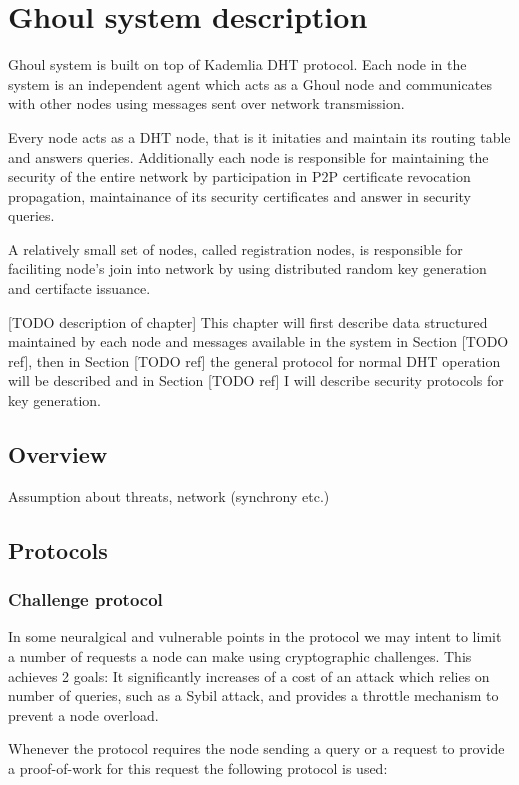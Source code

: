 \chapter{Ghoul system description}
Ghoul system is built on top of Kademlia DHT protocol. Each node in the system
is an independent agent which acts as a Ghoul node and communicates with other
nodes using messages sent over network transmission. 

Every node acts as a DHT node, that is it initaties and maintain its routing
table and answers queries. Additionally each node is responsible for maintaining
the security of the entire network by participation in P2P certificate
revocation propagation, maintainance of its security certificates and answer in
security queries.

A relatively small set of nodes, called registration nodes, is responsible for
faciliting node's join into network by using distributed random key generation
and certifacte issuance.

[TODO description of chapter]
This chapter will first describe data structured maintained by each node and
messages available in the system in Section [TODO ref], then in Section [TODO ref]
the general protocol for normal DHT operation will be described and in Section
[TODO ref] I will describe security protocols for key generation.

\section{Overview}
Assumption about threats, network (synchrony etc.)

\section{Protocols}
\subsection{Challenge protocol}
In some neuralgical and vulnerable points in the protocol we may intent to limit
a number of requests a node can make using cryptographic challenges. This
achieves 2 goals: It significantly increases of a cost of an attack which relies
on number of queries, such as a Sybil attack, and provides a throttle mechanism
to prevent a node overload.

Whenever the protocol requires the node sending a query or a request to provide
a proof-of-work for this request the following protocol is used:


